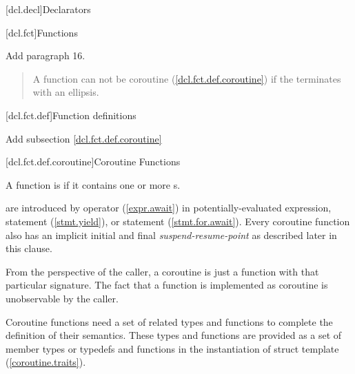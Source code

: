
[dcl.decl]{Declarators}

\setcounter{section}{3}
\setcounter{subsection}{4}
[dcl.fct]{Functions}%

Add paragraph 16.

\begin{quote}
\setcounter{Paras}{15}
\pnum
A function can not be coroutine (\ref{dcl.fct.def.coroutine}) if the  terminates with an ellipsis.
\end{quote}

\setcounter{section}{3}
[dcl.fct.def]{Function definitions}

Add subsection \ref{dcl.fct.def.coroutine}

\setcounter{subsection}{3}
[dcl.fct.def.coroutine]{Coroutine Functions}


\pnum
A function is  if it contains
one or more s. 

\pnum
{} are introduced by  operator (\ref{expr.await}) in potentially-evaluated expression,
 statement (\ref{stmt.yield}), 
or  statement (\ref{stmt.for.await}). Every coroutine function
also has an implicit initial and final \textit{suspend-resume-point} as described later in this clause. 

\pnum
\enternote
From the perspective of the caller, a coroutine is just a function with that particular signature. The fact that a function is implemented as coroutine is unobservable by the caller. 
\exitnote

\pnum
Coroutine functions need a set of related types and functions
to complete the definition of their semantics.
These types and functions are provided as a set of member types or typedefs
and functions in the instantiation of struct template
 (\ref{coroutine.traits}). 

